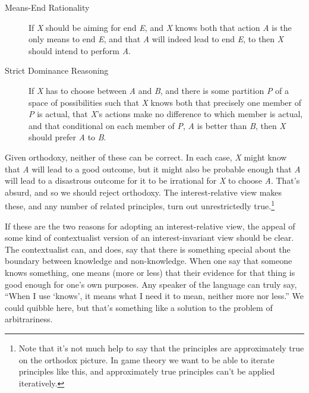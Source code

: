 \documentclass[
  12pt,
  letterpaper,
]{scrbook}
\begin{document}
\begin{description}
\item[Means-End Rationality]
If \emph{X} should be aiming for end \emph{E}, and \emph{X} knows both
that action \emph{A} is the only means to end \emph{E}, and that
\emph{A} will indeed lead to end \emph{E}, to then \emph{X} should
intend to perform \emph{A}.
\item[Strict Dominance Reasoning]
If \emph{X} has to choose between \emph{A} and \emph{B}, and there is
some partition \emph{P} of a space of possibilities such that \emph{X}
knows both that precisely one member of \emph{P} is actual, that
\emph{X}'s actions make no difference to which member is actual, and
that conditional on each member of \emph{P}, \emph{A} is better than
\emph{B}, then \emph{X} should prefer \emph{A} to \emph{B}.
\end{description}

Given orthodoxy, neither of these can be correct. In each case, \emph{X}
might know that \emph{A} will lead to a good outcome, but it might also
be probable enough that \emph{A} will lead to a disastrous outcome for
it to be irrational for \emph{X} to choose \emph{A}. That's absurd, and
so we should reject orthodoxy. The interest-relative view makes these,
and any number of related principles, turn out unrestrictedly
true.\footnote{Note that it's not much help to say that the principles
  are approximately true on the orthodox picture. In game theory we want
  to be able to iterate principles like this, and approximately true
  principles can't be applied iteratively.}

If these are the two reasons for adopting an interest-relative view, the
appeal of some kind of contextualist version of an interest-invariant
view should be clear. The contextualist can, and does, say that there is
something special about the boundary between knowledge and
non-knowledge. When one say that someone knows something, one means
(more or less) that their evidence for that thing is good enough for
one's own purposes. Any speaker of the language can truly say, ``When I
use `knows', it means what I need it to mean, neither more nor less.''
We could quibble here, but that's something like a solution to the
problem of arbitrariness.
\end{document}
